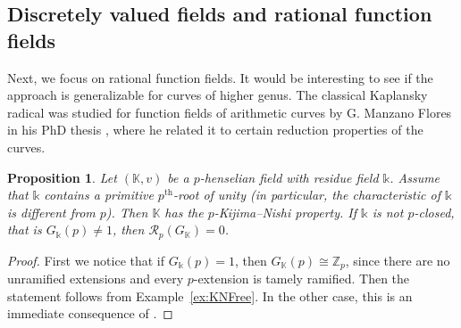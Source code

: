 \documentclass{amsart}
\newtheorem{prop}[thm]{Proposition}
\theoremstyle{definition}
\theoremstyle{remark}
\newcommand{\KK}{\mathbb{K}}
\newcommand{\ZZ}{\mathbb{Z}}
\newcommand{\calR}{\mathcal{R}}
\begin{document}
\subsection{Discretely valued fields and rational function fields}
Next, we focus on rational function fields. It would be interesting to see if the approach is generalizable for curves of higher genus.
The classical Kaplansky radical was studied for function fields of arithmetic curves by G. Manzano Flores in his PhD thesis \cite{Gonzalo2022}, where he related it to certain reduction properties of the curves. 


\begin{prop}
\label{prop:Radical of discretely valued field}
    Let $(\KK,v)$ be a $p$-henselian field with residue field $\mathbb{k}$. Assume that $\mathbb{k}$ contains a primitive $p^{\mathrm{th}}$-root of unity (in particular, the characteristic of $\mathbb{k}$ is different from $p$). Then $\KK$ has the $p$-Kijima--Nishi property. If $\mathbb{k}$ is not $p$-closed, that is $G_{\mathbb{k}}(p)\neq 1$, then $\calR_p(G_\KK)=0$.\
\end{prop}

\begin{proof}
    First we notice that if $G_\mathbb{k}(p)=1$, then $G_\KK(p)\cong \ZZ_p$, since there are no unramified extensions and every $p$-extension is tamely ramified. Then the statement follows from Example~\ref{ex:KNFree}. In the other case, this is an immediate consequence of \cite[Thm. 3.6]{Wadsworth}.
\end{proof}
\end{document}
